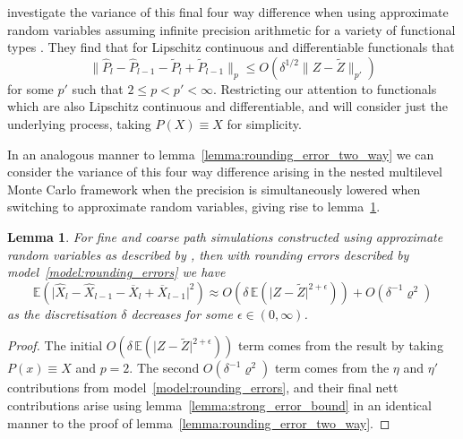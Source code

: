 \documentclass[9pt,a4paper,english]{extarticle}
\newtheorem{lemma}[theorem]{Lemma}
\begin{document}
\citet{giles2020approximate,giles2020approximating} investigate the variance of this final four way difference when using approximate random variables assuming infinite precision arithmetic for a variety of functional types \citep[lemmas~4.10 and 4.11]{giles2020approximate} \citep[corollaries~6.2.6.2 and 6.2.6.3]{sheridan2020nested}. They find that for Lipschitz continuous and differentiable functionals that 
\begin{equation*}
\lVert \widehat{P}_l - \widehat{P}_{l-1} - \widetilde{P}_l + \widetilde{P}_{l-1}\rVert_p 
\leq O(\delta^{1/2} \lVert Z - \widetilde{Z} \rVert_{p'}) 
\end{equation*}
for some  $ p' $ such that $ 2 \leq p < p' < \infty $. Restricting our attention to functionals which are also Lipschitz continuous and differentiable, and will consider just the underlying process, taking $ P(X)\equiv X $ for simplicity. 

In an analogous manner to lemma~\ref{lemma:rounding_error_two_way} we can consider the variance of this four way difference arising in the nested multilevel Monte Carlo framework when the precision is simultaneously lowered when switching to approximate random variables, giving rise to lemma~\ref{lemma:rounding_error_four_way}.

\begin{lemma}
\label{lemma:rounding_error_four_way}
For fine and coarse path simulations constructed using approximate random variables as described by \citet{giles2020approximate}, then with rounding errors described by model~\ref{model:rounding_errors} we have 
\begin{equation*}
\mathbb{E}(\lvert \widehat{X}_l - \widehat{X}_{l-1} - \overline{X}_l + \overline{X}_{l-1}\rvert^2) 
\approx O(\delta\, \mathbb{E}(\lvert Z - \widetilde{Z} \rvert^{2 + \epsilon})) + O(\delta^{-1}\varrho^2) 
\end{equation*}
as the discretisation $ \delta $ decreases for some $ \epsilon \in (0, \infty)$.
\end{lemma}

\begin{proof}
The initial $ O(\delta\, \mathbb{E}(\lvert Z - \widetilde{Z} \rvert^{2 + \epsilon})) $ term comes from the result by \citet{giles2020approximate,giles2020approximating} taking $ P(x) \equiv X $ and $ p = 2 $. The second  $ O(\delta^{-1}\varrho^2)  $ term comes from the $ \eta $ and $ \eta' $ contributions from model~\ref{model:rounding_errors}, and their final nett contributions arise using lemma~\ref{lemma:strong_error_bound} in an identical manner to the proof of lemma~\ref{lemma:rounding_error_two_way}. \qedhere
\end{proof}
\end{document}
